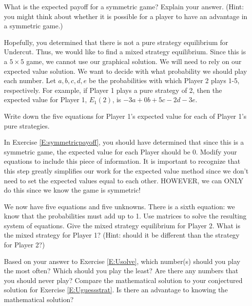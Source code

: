 \begin{xca}\label{E:symmetricpayoff}
What is the expected payoff for a symmetric game? Explain your answer. (Hint: you might think about whether it is possible for a player to have an advantage in a symmetric game.)
\end{xca}


Hopefully, you determined that there is not a pure strategy equilibrium for Undercut. Thus, we would like to find a mixed strategy equilibrium. Since this is a $5 \times 5$ game, we cannot use our graphical solution. We will need to rely on our expected value solution. We want to decide with what probability we should play each number. Let $a, b, c, d, e$ be the probabilities with which Player 2 plays 1-5, respectively. For example, if Player 1 plays a pure strategy of 2, then the expected value for Player 1, $E_1(2)$, is $-3a+0b+5c-2d-3e$. 



\begin{xca}\label{E:Uequations}
Write down the five equations for Player 1's expected value for each of Player 1's pure strategies.
\end{xca}

\begin{xca}\label{E:Uevzero} 
In Exercise \ref{E:symmetricpayoff}, you should have determined that since this is a symmetric game, the expected value for each Player should be 0. Modify your equations to include this piece of information. It is important to recognize that this step greatly simplifies our work for the expected value method since we don't need to set the expected values equal to each other. HOWEVER, we can ONLY do this since we know the game is symmetric!
\end{xca}

\begin{xca}\label{E:Usolve}
We now have five equations and five unknowns. There is a sixth equation: we know that the probabilities must add up to 1. Use matrices to solve the resulting system of equations. Give the mixed strategy equilibrium for Player 2. What is the mixed strategy for Player 1? (Hint: should it be different than the strategy for Player 2?) 
\end{xca}



\begin{xca}\label{E:Usummary}
Based on your answer to Exercise \ref{E:Usolve}, which number(s) should you play the most often? Which should you play the least? Are there any numbers that you should never play? Compare the mathematical solution to your conjectured solution for Exercise \ref{E:Uguessstrat}. Is there an advantage to knowing the mathematical solution? 

\end{xca}




 